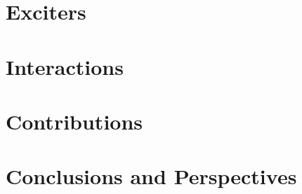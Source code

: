 \part{Exciters}\label{part:exciters}


\part{Interactions}\label{part:interactions}


% 

\part{Contributions}\label{part:contributions}


% 

\part{Conclusions and Perspectives}\label{part:conclusion}



\pagebreak

\makeatletter
\renewenvironment{thebibliography}[1]
     {\chapter*{\bibname}%
      \@mkboth{\MakeUppercase\bibname}{\MakeUppercase\bibname}%
      \list{\@biblabel{\@arabic\c@enumiv}}%
           {\settowidth\labelwidth{\@biblabel{#1}}%
            \leftmargin\labelwidth
            \advance\leftmargin\labelsep
            \@openbib@code
            \usecounter{enumiv}%
            \let\p@enumiv\@empty
            \renewcommand\theenumiv{\@arabic\c@enumiv}}%
      \sloppy
      \clubpenalty4000
      \@clubpenalty \clubpenalty
      \widowpenalty4000%
      \sfcode`\.\@m}
     {\def\@noitemerr
       {\@latex@warning{Empty `thebibliography' environment}}%
      \endlist}
\makeatother

